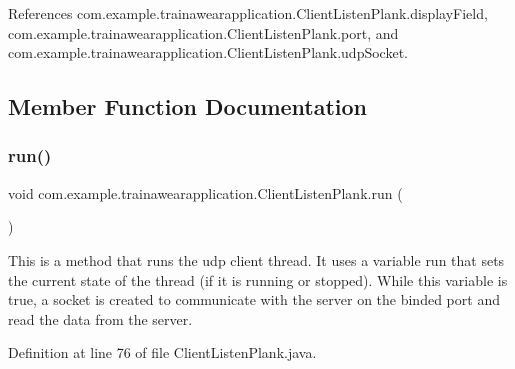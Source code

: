 References com.\+example.\+trainawearapplication.\+Client\+Listen\+Plank.\+display\+Field, com.\+example.\+trainawearapplication.\+Client\+Listen\+Plank.\+port, and com.\+example.\+trainawearapplication.\+Client\+Listen\+Plank.\+udp\+Socket.



\subsection{Member Function Documentation}
\mbox{\label{classcom_1_1example_1_1trainawearapplication_1_1_client_listen_plank_adb139f918c79291e8492364927a0b945}} 
\subsubsection{\texorpdfstring{run()}{run()}}
{\footnotesize\ttfamily void com.\+example.\+trainawearapplication.\+Client\+Listen\+Plank.\+run (\begin{DoxyParamCaption}{ }\end{DoxyParamCaption})}

This is a method that runs the udp client thread. It uses a variable run that sets the current state of the thread (if it is running or stopped). While this variable is true, a socket is created to communicate with the server on the binded port and read the data from the server.

Definition at line 76 of file Client\+Listen\+Plank.\+java.


